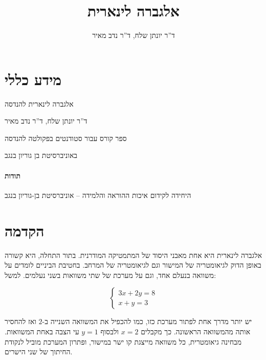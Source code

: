 \documentclass[
  hebrew,
  12pt,
  a4paper,
  oneside]{book}
\title{אלגברה לינארית}
\author{ד''ר יונתן שלח, ד''ר נדב מאיר}
\date{}
\theoremstyle{definition}
\theoremstyle{remark}
\theoremstyle{plain}
\renewcommand*\contentsname{תוכן עניינים}
\newcommand\contentsname{תוכן עניינים}
\theoremstyle{remark}
\begin{document}
\frontmatter
\maketitle

\renewcommand*\contentsname{תוכן עניינים}
{
\setcounter{tocdepth}{2}
\tableofcontents
}

\mainmatter
{}

\chapter*{מידע כללי}\label{ux5deux5d9ux5d3ux5e2-ux5dbux5dcux5dcux5d9}


אלגברה לינארית להנדסה

ד''ר יונתן שלח, ד''ר נדב מאיר

ספר קורס עבור סטודנטים בפקולטה להנדסה

באוניברסיטת בן גוריון בנגב

\subsubsection*{תודות}\label{ux5eaux5d5ux5d3ux5d5ux5ea}

היחידה לקידום איכות ההוראה והלמידה -- אוניברסיטת בן-גוריון בנגב


\chapter{הקדמה}\label{ux5d4ux5e7ux5d3ux5deux5d4}

אלגברה לינארית היא אחת מאבני היסוד של המתמטיקה המודרנית. בתור התחלה, היא
קשורה באופן הדוק לגיאומטריה של המישור וגם לגיאומטריה של המרחב. בחטיבת
הביניים לומדים על משוואה בנעלם אחד, וגם על מערכת של שתי משוואות בשני
נעלמים. למשל:

\[\begin{cases}
3x+2y=8\\
x+y=3
\end{cases}\]

יש יותר מדרך אחת לפתור מערכת כזו, כמו להכפיל את המשוואה השנייה ב-\(2\)
ואז להחסיר אותה מהמשוואה הראשונה. כך מקבלים \(x=2\) ולבסוף \(y=1\) עי
הצבה באחת המשוואות. מבחינה גיאומטרית, כל משוואה מייצגת קו ישר במישור,
ופתרון המערכת מוביל לנקודת החיתוך של שני הישרים.
\end{document}
